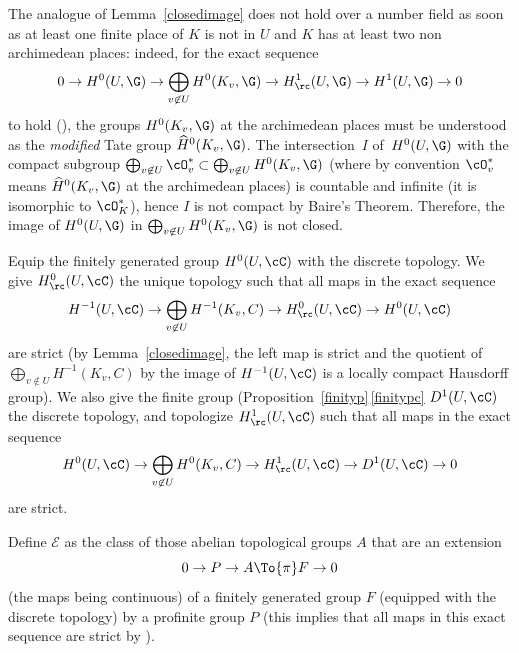 \begin{rema} \label{nocdn}
The analogue of Lemma~\ref{closedimage} does not hold over a number field
as soon as at least one finite place of $K$ is not in $U$ and $K$ has at
least two non archimedean places: indeed, for the exact sequence\vspace*{-3pt}
\[
0 \to H^0(U,\G) \to \bigoplus_{v \not \in U} H^0(K_v,\G) \to
H^1_\rc(U,\G) \to H^1(U,\G) \to 0
\]
to hold (\cf \cite[beginning of \S 2]{DemH}),
the groups $H^0(K_v,\G)$ at the archimedean places
must be understood as the \emph{modified} Tate group ${\widehat H}^0(K_v,\G)$.
The intersection~$I$ of~$H^0(U,\G)$ with
the compact subgroup
$\bigoplus_{v \not \in U} \cO_v^* \subset
\bigoplus_{v \not \in U} H^0(K_v,\G) $ (where by convention $\cO_v^*$
means ${\widehat H}^0(K_v,\G)$ at the archimedean places) is countable
and infinite (it is isomorphic to $\cO_K^*$),
hence $I$ is not compact by Baire's Theorem.
Therefore, the image of $H^0(U,\G)$ in $\bigoplus_{v \not \in U} H^0(K_v,\G)$
is not closed.
\end{rema}

Equip the finitely generated group $H^0(U,\cC)$ with the discrete
topology. We give $H^0_\rc(U, \cC)$ the unique topology such that all maps in
the exact sequence
\begin{equation} \label {toph0c}
H^{-1}(U,\cC)
\to \bigoplus_{v \not \in U} H^{-1}(K_v,C) \to H^0_\rc(U, \cC) \to H^0(U,\cC)
\end{equation}
are strict (by Lemma~\ref{closedimage}, the left map is strict and the
quotient of $\bigoplus_{v \not \in U} H^{-1}(K_v,C)$ by the image of
$H^{-1}(U,\cC)$ is a locally compact Hausdorff group).
We also give the finite group (\cf Proposition~\ref{finityp}\,\eqref{finitypc}
$D^1(U,\cC)$ the discrete topology, and topologize $H^1_\rc(U,\cC)$ such that
all maps in the exact sequence
\begin{equation} \label {toph1c}
H^0(U,\cC) \to \bigoplus_{v \not \in U} H^0(K_v,C) \to H^1_\rc(U, \cC) \to D^1(U,\cC) \to 0
\end{equation}
are strict.

\begin{defi}
Define ${\mathcal E}$ as the class of those abelian topological groups
$A$ that are an extension
\begin{equation} \label{extgroup}
0 \to P \to A \To{\pi}F \to 0
\end{equation}
(the maps being continuous)
of a finitely generated group $F$ (equipped with the
discrete topology) by a profinite group $P$ (this implies that all maps
in this exact sequence are strict by \cite[Lem.\,3.4]{DemH}).
\end{defi}

